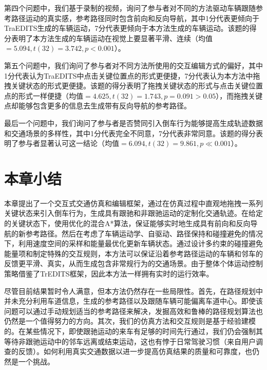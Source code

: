 第四个问题中，我们基于录制的视频，询问了参与者对不同的方法驱动车辆跟随参考路径运动的真实感，参考路径同时包含前向和反向导航，其中1分代表更倾向于TraEDITS生成的车辆运动，7分代表更倾向于本方法生成的车辆运动。该题的得分表明了本方法生成的车辆运动在视觉上要显著平滑、连续（均值$=5.094, t(32)=3.742, p<0.001$）。


第五个问题中，我们询问了参与者对不同方法所使用的交互编辑方式的偏好，其中1分代表认为TraEDITS中点击关键位置点的形式更便捷，7分代表认为本方法中拖拽关键状态的形式更便捷。该题的得分表明了拖拽关键状态的形式与点击关键位置点的形式一样便捷（均值$=4.625, t(32)=1.743, p=0.091>0.05$），而拖拽关键点却能够包含更多的信息去生成带有反向导航的参考路径。

最后一个问题中，我们询问了参与者是否赞同引入倒车行为能够提高生成轨迹数据和交通场景的多样性，其中1分代表完全不同意，7分代表非常同意。该题的得分表明了参与者显著认可这一结论（均值$=6.094, t(32)=9.861, p \ll 
 0.001$）。



\section{本章小结}

本章提出了一个交互式交通仿真和编辑框架，通过在仿真过程中直观地拖拽一系列关键状态来引入倒车行为，生成具有跟驰和非跟驰运动的定制化交通轨迹。在给定的关键状态下，使用优化的混合A*算法，保证能够实时地生成具有前向和反向导航的新参考路径。然后在考虑了车辆运动学、自驱动、路径保持和碰撞避免的情况下，利用速度空间的采样和能量最优化更新车辆状态。通过设计多约束的碰撞避免能量项和制定特殊的交互规则，本方法可以保证沿着参考路径运动的车辆和邻车的反馈更平滑、真实，从而生成包含非常规行为的交通场景。由于整体个体运动控制策略借鉴了TrEDITS框架，因此本方法一样拥有实时的运行效率。

尽管目前结果暂时令人满意，但本方法仍然存在一些局限性。首先，在路径规划中并未充分利用车道信息，生成的参考路径以及跟随车辆可能偏离车道中心。即使该问题可以通过手动规划适当的参考路径来解决，发掘高效和鲁棒的路径规划算法也仍然是一个值得努力的方向。其次，我们的仿真方法和交互规则是基于经验建模的。在某些情况下，即使跟驰运动的来车有足够的时间先行通过，我们仍会强制其等待非跟驰运动中的邻车远离或结束运动，这也有悖于日常驾驶习惯（来自用户调查的反馈）。如何利用真实交通数据以进一步提高仿真结果的质量和可靠度，也仍然是一个挑战。


